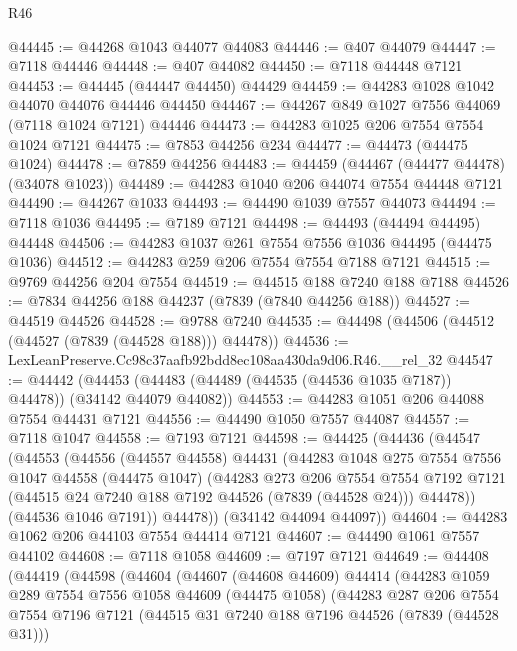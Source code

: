 \begin{lexlean}{R46}
\begin{coremodule}
@44445 := @44268 @1043 @44077 @44083
@44446 := @407 @44079
@44447 := @7118 @44446
@44448 := @407 @44082
@44450 := @7118 @44448 @7121
@44453 := @44445 (@44447 @44450) @44429
@44459 := @44283 @1028 @1042 @44070 @44076 @44446 @44450
@44467 := @44267 @849 @1027 @7556 @44069 (@7118 @1024 @7121) @44446
@44473 := @44283 @1025 @206 @7554 @7554 @1024 @7121
@44475 := @7853 @44256 @234
@44477 := @44473 (@44475 @1024)
@44478 := @7859 @44256
@44483 := @44459 (@44467 (@44477 @44478) (@34078 @1023))
@44489 := @44283 @1040 @206 @44074 @7554 @44448 @7121
@44490 := @44267 @1033
@44493 := @44490 @1039 @7557 @44073
@44494 := @7118 @1036
@44495 := @7189 @7121
@44498 := @44493 (@44494 @44495) @44448
@44506 := @44283 @1037 @261 @7554 @7556 @1036 @44495 (@44475 @1036)
@44512 := @44283 @259 @206 @7554 @7554 @7188 @7121
@44515 := @9769 @44256 @204 @7554
@44519 := @44515 @188 @7240 @188 @7188
@44526 := @7834 @44256 @188 @44237 (@7839 (@7840 @44256 @188))
@44527 := @44519 @44526
@44528 := @9788 @7240
@44535 := @44498 (@44506 (@44512 (@44527 (@7839 (@44528 @188))) @44478))
@44536 := LexLeanPreserve.Cc98c37aafb92bdd8ec108aa430da9d06.R46.__rel_32
@44547 := @44442
    (@44453 (@44483 (@44489 (@44535 (@44536 @1035 @7187)) @44478)) (@34142 @44079 @44082))
@44553 := @44283 @1051 @206 @44088 @7554 @44431 @7121
@44556 := @44490 @1050 @7557 @44087
@44557 := @7118 @1047
@44558 := @7193 @7121
@44598 := @44425
    (@44436
      (@44547
        (@44553
          (@44556
            (@44557 @44558)
            @44431
            (@44283
              @1048
              @275
              @7554
              @7556
              @1047
              @44558
              (@44475 @1047)
              (@44283
                @273
                @206
                @7554
                @7554
                @7192
                @7121
                (@44515 @24 @7240 @188 @7192 @44526 (@7839 (@44528 @24)))
                @44478))
            (@44536 @1046 @7191))
          @44478))
      (@34142 @44094 @44097))
@44604 := @44283 @1062 @206 @44103 @7554 @44414 @7121
@44607 := @44490 @1061 @7557 @44102
@44608 := @7118 @1058
@44609 := @7197 @7121
@44649 := @44408
    (@44419
      (@44598
        (@44604
          (@44607
            (@44608 @44609)
            @44414
            (@44283
              @1059
              @289
              @7554
              @7556
              @1058
              @44609
              (@44475 @1058)
              (@44283
                @287
                @206
                @7554
                @7554
                @7196
                @7121
                (@44515 @31 @7240 @188 @7196 @44526 (@7839 (@44528 @31)))

\end{coremodule}
\end{lexlean}
